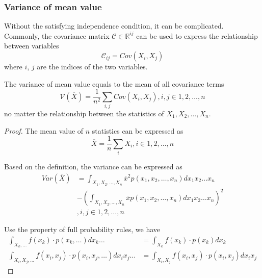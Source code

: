 \documentclass[../main.tex]{subfiles}
\begin{document}
\subsubsection{Variance of mean value}

Without the satisfying independence condition, it can be complicated.
Commonly, the covariance matrix $\mathcal{C} \in \mathbb{R}^{ij}$ can be used to express the relationship between variables
\begin{equation*}
    \mathcal{C}_{ij} = Cov(X_i, X_j)
\end{equation*}
where $i$, $j$ are the indices of the two variables.
\begin{lemma}
    \label{Lemma: Variance of mean value}
    The variance of mean value equals to the mean of all covariance terms
    \begin{equation*}
        \mathcal{V}(\overline{X}) =
        \frac{1}{n^2} \sum_{i, j} Cov(X_i, X_j),
        i, j \in 1, 2, \dots, n
    \end{equation*}
    no matter the relationship between the statistics of $X_1, X_2, \dots, X_n$.

    \begin{proof}
        The mean value of $n$ statistics can be expressed as
        \begin{equation*}
            \overline{X} = \frac{1}{n} \sum_{i} X_i,
            i \in 1, 2, \dots, n
        \end{equation*}

        Based on the definition, the variance can be expressed as
        \begin{align*}
            Var(\overline{X}) & =  \int_{X_1, X_2, \dots, X_n} {\overline{x}}^2 p(x_1, x_2, \dots, x_n) dx_1 x_2 \dots x_n \\
                              & - (\int_{X_1, X_2, \dots, X_n} \overline{x} p(x_1, x_2, \dots, x_n) dx_1 x_2 \dots x_n)^2  \\
                              & , i, j \in 1, 2, \dots, n
        \end{align*}

        Use the property of full probability rules, we have
        \begin{align*}
            \int_{X_k, \dots} f(x_k) \cdot p(x_k, \dots) dx_k \dots                    & = \int_{X_k} f(x_k) \cdot p(x_k) dx_k                    \\
            \int_{X_i, X_j, \dots} f(x_i, x_j) \cdot p(x_i, x_j, \dots) dx_i x_j \dots & = \int_{X_i, X_j} f(x_i, x_j) \cdot p(x_i, x_j) dx_i x_j
        \end{align*}


\end{proof}
\end{lemma}
\end{document}
